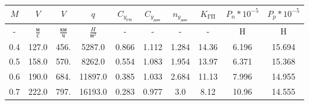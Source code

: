 \begin{tabular}{|c|c|c|c|c|c|c|c|c|c|}
\hline
$M$ & $V$ & $V$ & $q$ & $C_{y_{ГП}}$ & $C_{y_{доп}}$ & $n_{y_{доп}}$ & $K_{ГП}$ & $P_{n}*10^{-5}$ & $P_{p}*10^{-5}$ \\ 
\hline
- & $\frac{м}{с}$ & $\frac{км}{ч}$ & $\frac{H}{м^2}$ & - & - & - & - & H & H \\ 
\hline
0.4 & 127.0 & 456. & 5287.0 & 0.866 & 1.112 & 1.284 & 14.36 & 6.196 & 15.694 \\ 
\hline
0.5 & 158.0 & 570. & 8262.0 & 0.554 & 1.083 & 1.954 & 13.97 & 6.371 & 15.368 \\ 
\hline
0.6 & 190.0 & 684. & 11897.0 & 0.385 & 1.033 & 2.684 & 11.13 & 7.996 & 14.955 \\ 
\hline
0.7 & 222.0 & 797. & 16193.0 & 0.283 & 0.977 & 3.0 & 8.12 & 10.96 & 14.555 \\ 
\hline
\end{tabular}